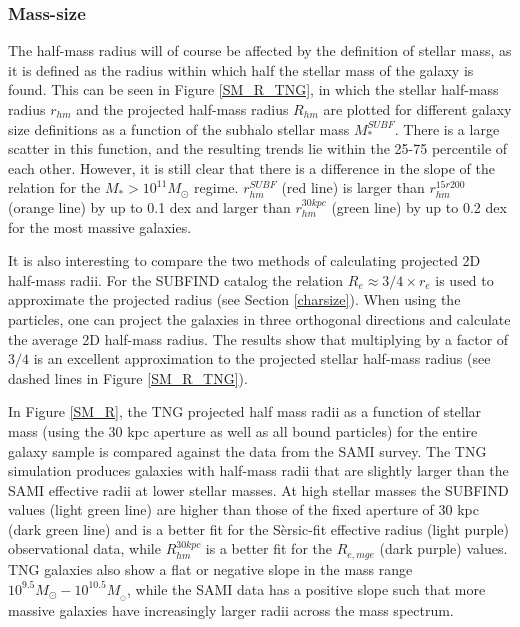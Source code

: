 \subsubsection{Mass-size}
The half-mass radius will of course be affected by the definition of stellar mass, as it is defined as the radius within which half the stellar mass of the galaxy is found. This can be seen in Figure \ref{SM_R_TNG}, in which the stellar half-mass radius $r_{hm}$ and the projected half-mass radius $R_{hm}$ are plotted for different galaxy size definitions as a function of the subhalo stellar mass $M^{SUBF}_\ast$. There is a large scatter in this function, and the resulting trends lie within the 25-75 percentile of each other. However, it is still clear that there is a difference in the slope of the relation for the $M_\ast > 10^{11} M_{\odot}$ regime. $r^{SUBF}_{hm}$ (red line) is larger than $r^{15r200}_{hm}$ (orange line) by up to 0.1 dex and larger than $r^{30kpc}_{hm}$ (green line) by up to 0.2 dex for the most massive galaxies. %

It is also interesting to compare the two methods of calculating projected 2D half-mass radii. For the SUBFIND catalog the relation $R_{e} \approx 3/4 \times r_{e}$ is used to approximate the projected radius (see Section \ref{charsize}). When using the particles, one can project the galaxies in three orthogonal directions and calculate the average 2D half-mass radius. The results show that multiplying by a factor of $3/4$ is an excellent approximation to the projected stellar half-mass radius (see dashed lines in Figure \ref{SM_R_TNG}).

In Figure \ref{SM_R}, the TNG projected half mass radii as a function of stellar mass (using the 30 kpc aperture as well as all bound particles) for the entire galaxy sample is compared against the data from the SAMI survey. The TNG simulation produces galaxies with half-mass radii that are slightly larger than the SAMI effective radii at lower stellar masses. At high stellar masses the SUBFIND values (light green line) are higher than those of the fixed aperture of 30 kpc (dark green line) and is a better fit for the Sèrsic-fit effective radius (light purple) observational data, while $R_{hm}^{30kpc}$ is a better fit for the $R_{e, mge}$ (dark purple) values. TNG galaxies also show a flat or negative slope in the mass range $10^{9.5} M_{\odot} - 10^{10.5} M_{_\odot}$, while the SAMI data has a positive slope such that more massive galaxies have increasingly larger radii across the mass spectrum.


